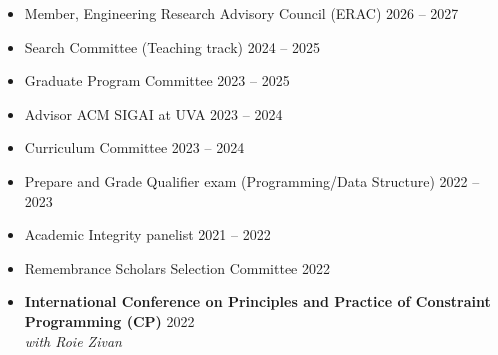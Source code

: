 
\smallskip
{}
  \begin{itemize}
    \item Member, Engineering Research Advisory Council (ERAC) \hfill 2026 -- 2027
    \item Search Committee (Teaching track) \hfill 2024 -- 2025
    \item Graduate Program Committee \hfill 2023 -- 2025
    \item Advisor ACM SIGAI at UVA  \hfill 2023 -- 2024
  \end{itemize}

  \begin{itemize}
    \item Curriculum Committee \hfill 2023 -- 2024
    \item Prepare and Grade Qualifier exam (Programming/Data Structure) \hfill 2022 -- 2023
    \item Academic Integrity panelist \hfill 2021 -- 2022
    \item Remembrance Scholars Selection Committee \hfill 2022
  \end{itemize}


\smallskip
{}
\begin{itemize}    
    \item {\bf International Conference on Principles and Practice of Constraint Programming (CP)}  \hfill{2022} \\
    {\em with Roie Zivan}
\end{itemize}

